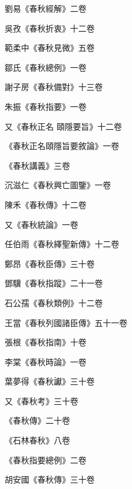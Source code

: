 \begin{pinyinscope}
 劉易《春秋經解》二卷



 吳孜《春秋折衷》十二卷



 範柔中《春秋見微》五卷



 鄒氏《春秋總例》一卷



 謝子房《春秋備對》十三卷



 朱振《春秋指要》一卷



 又《春秋正名
 頤隱要旨》十二卷



 《春秋正名頤隱旨要敘論》一卷



 《春秋講義》三卷



 沉滋仁《春秋興亡圖鑒》一卷



 陳禾《春秋傳》十二卷



 又《春秋統論》一卷



 任伯雨《春秋繹聖新傳》十二卷



 鄭昂《春秋臣傳》三十卷



 鄧驥《春秋指蹤》二十一卷



 石公孺《春秋類例》十二卷



 王當《春秋列國諸臣傳》五十一卷



 張根《春秋指南》十卷



 李棠《春秋時論》一卷



 葉夢得《春秋讞》三十卷



 又《春秋考》三十卷



 《春秋傳》二十卷



 《石林春秋》八卷



 《春秋指要總例》二卷



 胡安國《春秋傳》三十卷




\end{pinyinscope}
